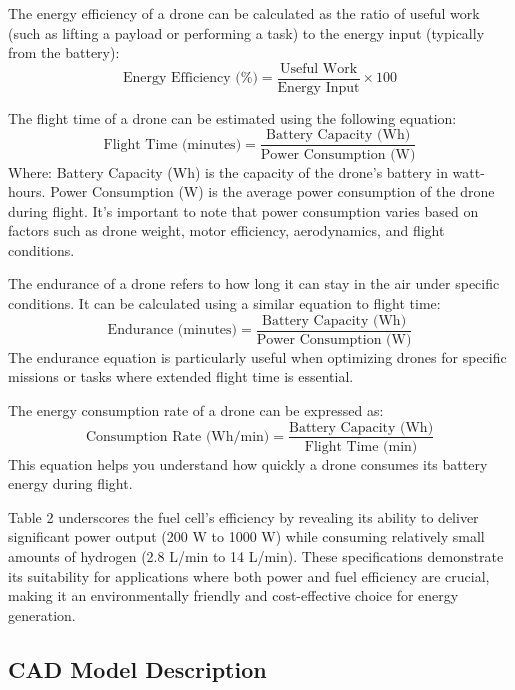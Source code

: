 \documentclass[preprint,12pt]{elsarticle}
\begin{document}
The energy efficiency of a drone can be calculated as the ratio of useful work (such as lifting a payload or performing a task) to the energy input (typically from the battery):
\begin{equation}
\text{Energy Efficiency (\%)} = \frac{\text{Useful Work}}{\text{Energy Input}} \times 100
\end{equation}

The flight time of a drone can be estimated using the following equation:
\begin{equation}
\text{Flight Time (minutes)} = \frac{\text{Battery Capacity (Wh)}}{\text{Power Consumption (W)}}
\end{equation}
Where:
Battery Capacity (Wh) is the capacity of the drone's battery in watt-hours.
Power Consumption (W) is the average power consumption of the drone during flight.
It's important to note that power consumption varies based on factors such as drone weight, motor efficiency, aerodynamics, and flight conditions.

The endurance of a drone refers to how long it can stay in the air under specific conditions. It can be calculated using a similar equation to flight time:
\begin{equation}
\text{Endurance (minutes)} = \frac{\text{Battery Capacity (Wh)}}{\text{Power Consumption (W)}}
\end{equation}
The endurance equation is particularly useful when optimizing drones for specific missions or tasks where extended flight time is essential.

The energy consumption rate of a drone can be expressed as:
\begin{equation}
\text{Consumption Rate (Wh/min)} = \frac{\text{Battery Capacity (Wh)}}{\text{Flight Time (min)}}
\end{equation}
This equation helps you understand how quickly a drone consumes its battery energy during flight.

Table 2  underscores the fuel cell's efficiency by revealing its ability to deliver significant power output (200 W to 1000 W) while consuming relatively small amounts of hydrogen (2.8 L/min to 14 L/min). These specifications demonstrate its suitability for applications where both power and fuel efficiency are crucial, making it an environmentally friendly and cost-effective choice for energy generation.


\subsection{CAD Model Description}
\end{document}
